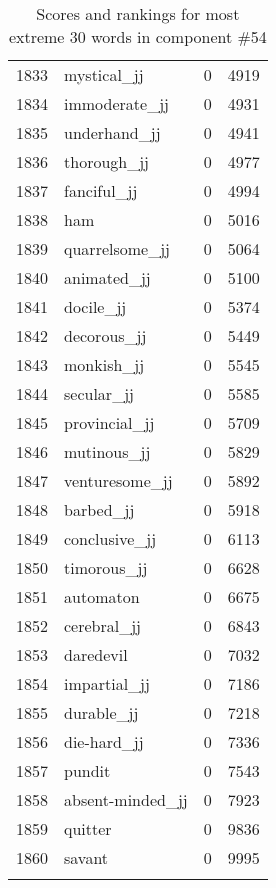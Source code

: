 \begin{longtable}[!htbp]{| rlr@{.}l |}
    1833 & mystical\_jj & 0 & 4919 \\
    1834 & immoderate\_jj & 0 & 4931 \\
    1835 & underhand\_jj & 0 & 4941 \\
    1836 & thorough\_jj & 0 & 4977 \\
    1837 & fanciful\_jj & 0 & 4994 \\
    1838 & ham & 0 & 5016 \\
    1839 & quarrelsome\_jj & 0 & 5064 \\
    1840 & animated\_jj & 0 & 5100 \\
    1841 & docile\_jj & 0 & 5374 \\
    1842 & decorous\_jj & 0 & 5449 \\
    1843 & monkish\_jj & 0 & 5545 \\
    1844 & secular\_jj & 0 & 5585 \\
    1845 & provincial\_jj & 0 & 5709 \\
    1846 & mutinous\_jj & 0 & 5829 \\
    1847 & venturesome\_jj & 0 & 5892 \\
    1848 & barbed\_jj & 0 & 5918 \\
    1849 & conclusive\_jj & 0 & 6113 \\
    1850 & timorous\_jj & 0 & 6628 \\
    1851 & automaton & 0 & 6675 \\
    1852 & cerebral\_jj & 0 & 6843 \\
    1853 & daredevil & 0 & 7032 \\
    1854 & impartial\_jj & 0 & 7186 \\
    1855 & durable\_jj & 0 & 7218 \\
    1856 & die-hard\_jj & 0 & 7336 \\
    1857 & pundit & 0 & 7543 \\
    1858 & absent-minded\_jj & 0 & 7923 \\
    1859 & quitter & 0 & 9836 \\
    1860 & savant & 0 & 9995 \\
    \hline
    \caption{Scores and rankings for most extreme 30 words in component \#54} \\
\end{longtable}
